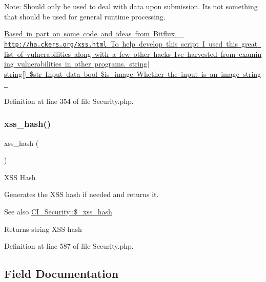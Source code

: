 Note\+: Should only be used to deal with data upon submission. It\textquotesingle{}s not something that should be used for general runtime processing.

\mbox{\hyperlink{}{Based in part on some code and ideas from Bitflux.  \href{http://ha.ckers.org/xss.html}{\texttt{ http\+://ha.\+ckers.\+org/xss.\+html}} To help develop this script I used this great list of vulnerabilities along with a few other hacks I\textquotesingle{}ve harvested from examining vulnerabilities in other programs.  string$\vert$string\mbox{[}\mbox{]} \$str Input data  bool \$is\+\_\+image Whether the input is an image  string }}

Definition at line 354 of file Security.\+php.

\mbox{\label{class_c_i___security_ae2f831d3f277e1c03730b28fd1734186}} 
\subsubsection{\texorpdfstring{xss\_hash()}{xss\_hash()}}
{\footnotesize\ttfamily xss\+\_\+hash (\begin{DoxyParamCaption}{ }\end{DoxyParamCaption})}

X\+SS Hash

Generates the X\+SS hash if needed and returns it.

\begin{DoxySeeAlso}{See also}
\mbox{\hyperlink{class_c_i___security_aca426a0e87199bfa36c7401a1d06a419}{C\+I\+\_\+\+Security\+::\$\+\_\+xss\+\_\+hash}} 
\end{DoxySeeAlso}
\begin{DoxyReturn}{Returns}
string X\+SS hash 
\end{DoxyReturn}


Definition at line 587 of file Security.\+php.



\subsection{Field Documentation}
\mbox{\label{class_c_i___security_a52043f2c9ffb0e14eade8e67a0172a82}} 
